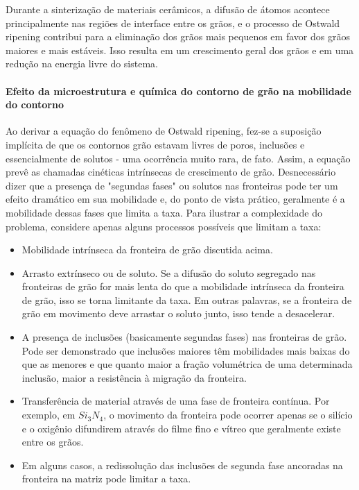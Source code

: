 Durante a sinterização de materiais cerâmicos, a difusão de átomos acontece principalmente nas regiões de interface entre os grãos, e o processo de Ostwald ripening contribui para a eliminação dos grãos mais pequenos em favor dos grãos maiores e mais estáveis. Isso resulta em um crescimento geral dos grãos e em uma redução na energia livre do sistema.

\paragraph*{Efeito da microestrutura e química do contorno de grão na mobilidade do contorno}

Ao derivar a equação do fenômeno de Ostwald ripening, fez-se a suposição implícita de que os contornos grão estavam livres de poros, inclusões e essencialmente de solutos - uma ocorrência muito rara, de fato. Assim, a equação prevê as chamadas cinéticas intrínsecas de crescimento de grão. Desnecessário dizer que a presença de "segundas fases" ou solutos nas fronteiras pode ter um efeito dramático em sua mobilidade e, do ponto de vista prático, geralmente é a mobilidade dessas fases que limita a taxa. Para ilustrar a complexidade do problema, considere apenas alguns processos possíveis que limitam a taxa:

\begin{itemize}
    \item Mobilidade intrínseca da fronteira de grão discutida acima.
    \item Arrasto extrínseco ou de soluto. Se a difusão do soluto segregado nas fronteiras de grão for mais lenta do que a mobilidade intrínseca da fronteira de grão, isso se torna limitante da taxa. Em outras palavras, se a fronteira de grão em movimento deve arrastar o soluto junto, isso tende a desacelerar.
    \item A presença de inclusões (basicamente segundas fases) nas fronteiras de grão. Pode ser demonstrado que inclusões maiores têm mobilidades mais baixas do que as menores e que quanto maior a fração volumétrica de uma determinada inclusão, maior a resistência à migração da fronteira.
    \item Transferência de material através de uma fase de fronteira contínua. Por exemplo, em $Si_3N_4$, o movimento da fronteira pode ocorrer apenas se o silício e o oxigênio difundirem através do filme fino e vítreo que geralmente existe entre os grãos.
    \item Em alguns casos, a redissolução das inclusões de segunda fase ancoradas na fronteira na matriz pode limitar a taxa.
\end{itemize}

